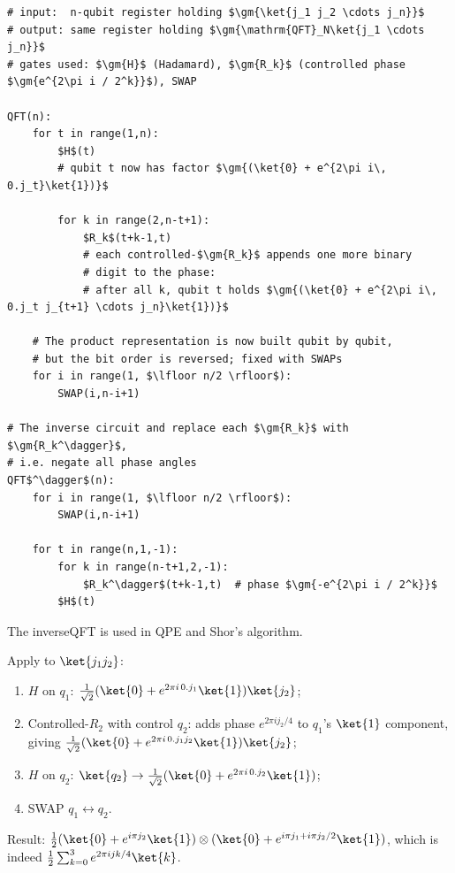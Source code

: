 \documentclass[oneside]{academica}
\begin{document}
\begin{lstlisting}
# input:  n-qubit register holding $\gm{\ket{j_1 j_2 \cdots j_n}}$
# output: same register holding $\gm{\mathrm{QFT}_N\ket{j_1 \cdots j_n}}$
# gates used: $\gm{H}$ (Hadamard), $\gm{R_k}$ (controlled phase $\gm{e^{2\pi i / 2^k}}$), SWAP

QFT(n):
    for t in range(1,n):
        $H$(t)
        # qubit t now has factor $\gm{(\ket{0} + e^{2\pi i\, 0.j_t}\ket{1})}$

        for k in range(2,n-t+1):
            $R_k$(t+k-1,t)
            # each controlled-$\gm{R_k}$ appends one more binary
            # digit to the phase:
            # after all k, qubit t holds $\gm{(\ket{0} + e^{2\pi i\, 0.j_t j_{t+1} \cdots j_n}\ket{1})}$

    # The product representation is now built qubit by qubit,
    # but the bit order is reversed; fixed with SWAPs
    for i in range(1, $\lfloor n/2 \rfloor$):
        SWAP(i,n-i+1)

# The inverse circuit and replace each $\gm{R_k}$ with $\gm{R_k^\dagger}$,
# i.e. negate all phase angles
QFT$^\dagger$(n):
    for i in range(1, $\lfloor n/2 \rfloor$):
        SWAP(i,n-i+1)

    for t in range(n,1,-1):
        for k in range(n-t+1,2,-1):
            $R_k^\dagger$(t+k-1,t)  # phase $\gm{-e^{2\pi i / 2^k}}$
        $H$(t)
\end{lstlisting}

The inverseQFT is used in QPE and Shor's algorithm.

\begin{example*}[QFT on 2 qubits ($N=4$)]
  Apply to $\ket{j_1 j_2}$:
  \begin{enumerate}
    \item $H$ on $q_1$: $\frac{1}{\sqrt{2}}(\ket{0}+e^{2\pi i\,0.j_1}\ket{1})\ket{j_2}$;
    \item Controlled-$R_2$ with control $q_2$: adds phase $e^{2\pi i j_2/4}$ to $q_1$'s $\ket{1}$ component, giving $\frac{1}{\sqrt{2}}(\ket{0}+e^{2\pi i\,0.j_1 j_2}\ket{1})\ket{j_2}$;
    \item $H$ on $q_2$: $\ket{q_2}\to\frac{1}{\sqrt{2}}(\ket{0}+e^{2\pi i\,0.j_2}\ket{1})$;
    \item SWAP $q_1\leftrightarrow q_2$.
  \end{enumerate}
  Result: $\frac{1}{2}(\ket{0}+e^{i\pi j_2}\ket{1})\otimes(\ket{0}+e^{i\pi j_1+i\pi j_2/2}\ket{1})$, which is indeed $\frac{1}{2}\sum_{k=0}^3 e^{2\pi ijk/4}\ket{k}$.
\end{example*}
\end{document}

